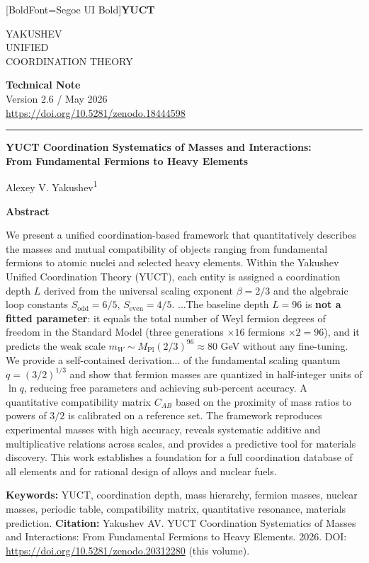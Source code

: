 \documentclass[11pt,a4paper]{article}
\newcommand{\makeheader}{%
	\noindent
	\begin{minipage}{0.17\textwidth}
		\raggedright
		{\fontspec{Segoe UI}[BoldFont=Segoe UI Bold]\bfseries\color{skyblue}\fontsize{46}{46}\selectfont YUCT}%
	\end{minipage}%
	\hspace{30pt}
	\begin{minipage}{0.32\textwidth}
		\raggedright
		{\sffamily\fontsize{11}{13}\selectfont YAKUSHEV\\ UNIFIED\\ COORDINATION THEORY}%
	\end{minipage}%
	\hfill
	\begin{minipage}{0.38\textwidth}
		\raggedleft
		{\sffamily\bfseries Technical Note}\\ 
		{\sffamily Version 2.6 / May 2026}\\ 
		{\sffamily\footnotesize \url{https://doi.org/10.5281/zenodo.18444598}}%
	\end{minipage}
	\par\vspace{5pt}
	\noindent\textcolor{gold}{\rule{\textwidth}{1.6pt}}
	\par\vspace{0pt}
}
\begin{document}
	\thispagestyle{firstpage}
	\makeheader
	
	\vspace{0cm}
	{\LARGE\bfseries YUCT Coordination Systematics of Masses and Interactions:\\ 
		\Large From Fundamental Fermions to Heavy Elements \par}
	\vspace{0.2cm}
	
	{\large Alexey V. Yakushev\textsuperscript{1}} \\
	\vspace{0.0cm}
	
	{\color{darkblue}\textbf{\LARGE Abstract}} \par
	{\large
		\noindent
		We present a unified coordination-based framework that quantitatively describes the masses and mutual compatibility of objects ranging from fundamental fermions to atomic nuclei and selected heavy elements. Within the Yakushev Unified Coordination Theory (YUCT), each entity is assigned a coordination depth \(L\) derived from the universal scaling exponent \(\beta = 2/3\) and the algebraic loop constants \(S_{\mathrm{odd}}=6/5\), \(S_{\mathrm{even}}=4/5\). ...The baseline depth \(L=96\) is \textbf{not a fitted parameter}: it equals the total number of Weyl fermion degrees of freedom in the Standard Model (three generations $\times 16$ fermions $\times 2 = 96$), and it predicts the weak scale $m_W \sim M_{\mathrm{Pl}}(2/3)^{96} \approx 80$ GeV without any fine-tuning. We provide a self-contained derivation... of the fundamental scaling quantum \(q = (3/2)^{1/3}\) and show that fermion masses are quantized in half-integer units of \(\ln q\), reducing free parameters and achieving sub-percent accuracy. A quantitative compatibility matrix \(C_{AB}\) based on the proximity of mass ratios to powers of \(3/2\) is calibrated on a reference set. The framework reproduces experimental masses with high accuracy, reveals systematic additive and multiplicative relations across scales, and provides a predictive tool for materials discovery. This work establishes a foundation for a full coordination database of all elements and for rational design of alloys and nuclear fuels.}
	
	\vspace{0.1cm}
	\noindent
	{\color{darkblue}\textbf{Keywords:}} YUCT, coordination depth, mass hierarchy, fermion masses, nuclear masses, periodic table, compatibility matrix, quantitative resonance, materials prediction.
	\vspace{0.1cm}
	\noindent
	{\color{darkblue}\textbf{Citation:}} Yakushev AV. YUCT Coordination Systematics of Masses and Interactions: From Fundamental Fermions to Heavy Elements. 2026. DOI: \url{https://doi.org/10.5281/zenodo.20312280} (this volume).
	
\end{document}
